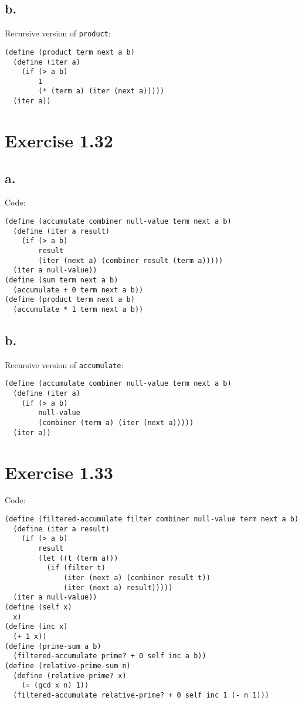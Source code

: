 \documentclass[../main.tex]{subfiles}
\begin{document}
\subsection*{b.}

Recursive version of \lstinline{product}:

\begin{lstlisting}
(define (product term next a b)
  (define (iter a)
    (if (> a b)
        1
        (* (term a) (iter (next a)))))
  (iter a))
\end{lstlisting}

\section{Exercise 1.32}

\subsection*{a.}

Code:

\begin{lstlisting}
(define (accumulate combiner null-value term next a b)
  (define (iter a result)
    (if (> a b)
        result
        (iter (next a) (combiner result (term a)))))
  (iter a null-value))
(define (sum term next a b)
  (accumulate + 0 term next a b))
(define (product term next a b)
  (accumulate * 1 term next a b))
\end{lstlisting}

\subsection*{b.}

Recursive version of \lstinline{accumulate}:

\begin{lstlisting}
(define (accumulate combiner null-value term next a b)
  (define (iter a)
    (if (> a b)
        null-value
        (combiner (term a) (iter (next a)))))
  (iter a))
\end{lstlisting}

\section{Exercise 1.33}

Code:

\begin{lstlisting}
(define (filtered-accumulate filter combiner null-value term next a b)
  (define (iter a result)
    (if (> a b)
        result
        (let ((t (term a)))
          (if (filter t)
              (iter (next a) (combiner result t))
              (iter (next a) result)))))
  (iter a null-value))
(define (self x)
  x)
(define (inc x)
  (+ 1 x))
(define (prime-sum a b)
  (filtered-accumulate prime? + 0 self inc a b))
(define (relative-prime-sum n)
  (define (relative-prime? x)
    (= (gcd x n) 1))
  (filtered-accumulate relative-prime? + 0 self inc 1 (- n 1)))
\end{lstlisting}
\end{document}
